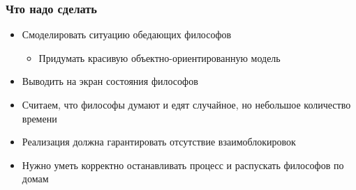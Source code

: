 \documentclass{../../slides-style}
\begin{document}
    \begin{frame}
        \frametitle{Что надо сделать}
        \begin{itemize}
            \item Смоделировать ситуацию обедающих философов
            \begin{itemize}
                \item Придумать красивую объектно-ориентированную модель
            \end{itemize}
            \item Выводить на экран состояния философов
            \item Считаем, что философы думают и едят случайное, но небольшое количество времени
            \item Реализация должна гарантировать отсутствие взаимоблокировок
            \item Нужно уметь корректно останавливать процесс и распускать философов по домам
        \end{itemize}
    \end{frame}
\end{document}
